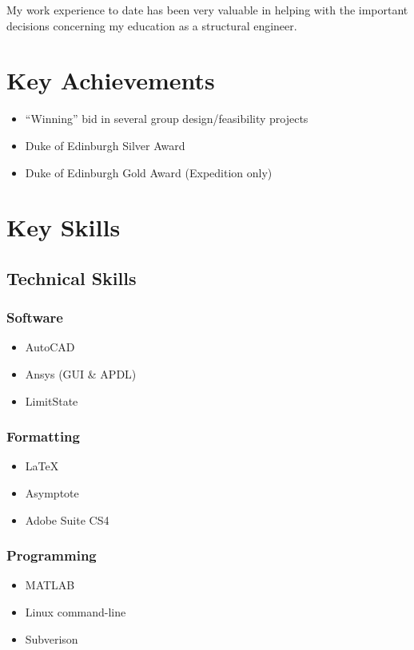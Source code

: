 \documentclass[a4paper]{article}
\begin{document}
My work experience to date has been very valuable in helping with the important decisions concerning my education as a structural engineer.

\section*{Key Achievements}

\begin{itemize}
\item ``Winning'' bid in several group design/feasibility projects
\item Duke of Edinburgh Silver Award
\item Duke of Edinburgh Gold Award (Expedition only)
\end{itemize}

\section*{Key Skills}

\subsection*{Technical Skills}
\begin{multicols}{3}

\subsubsection*{Software}
\begin{itemize}
\item AutoCAD
\item Ansys (GUI \& APDL)
\item LimitState
\end{itemize}

\subsubsection*{Formatting}
\begin{itemize}
\item \LaTeX
\item Asymptote
\item Adobe Suite CS4
\end{itemize}

\subsubsection*{Programming}
\begin{itemize}
\item MATLAB
\item Linux command-line
\item Subverison
\end{itemize}

\end{multicols}
\end{document}
